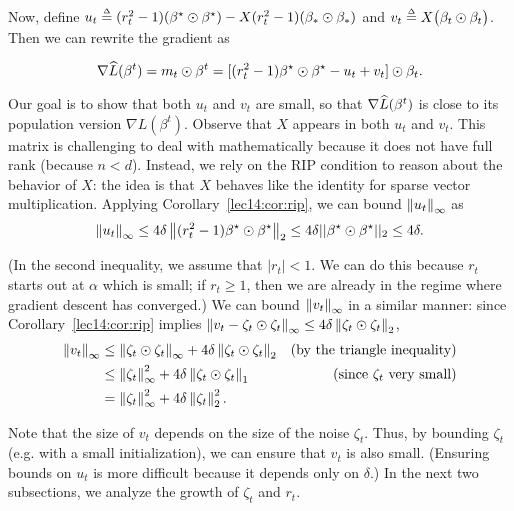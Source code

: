 Now, define $u_{t} \defeq (r_{t}^{2} - 1) (\beta^\star \odot \beta^\star) - X (r_{t}^{2} - 1) (\beta_{*} \odot \beta_{*})$ and $v_{t} \defeq X \big(\beta_{t} \odot \beta_{t}\big)$. Then we can rewrite the gradient as

\begin{equation}
    \nabla \widehat{L}(\beta^t) = m_{t} \odot \beta^{t} = [(r_{t}^{2} -1) \beta^\star \odot \beta^\star - u_{t} + v_{t}] \odot \beta_{t}. \label{lec14:eqn:emp-gradient}
\end{equation}

Our goal is to show that both $u_t$ and $v_t$ are small, so that $\nabla \widehat{L}(\beta^t)$ is close to its population version $\nabla L(\beta^t)$. Observe that $X$ appears in both $u_{t}$ and $v_{t}$. This matrix is challenging to deal with mathematically because it does not have full rank (because $n < d$). Instead, we rely on the RIP condition to reason about the behavior of $X$: the idea is that $X$ behaves like the identity for sparse vector multiplication. Applying Corollary~\ref{lec14:cor:rip}, we can bound $\left\|u_{t}\right\|_{\infty}$ as
\begin{equation} \label{lec14:eqn:u-inf-norm}
    \left\|u_{t}\right\|_{\infty} \leq 4\delta \left\|(r_t^2 - 1)  \beta^\star \odot \beta^\star \right\|_{2} 
    \leq 4\delta ||\beta^\star \odot \beta^\star||_{2} \leq 4\delta.
\end{equation}

(In the second inequality, we assume that $|r_t| < 1$. We can do this because $r_t$ starts out at $\alpha$ which is small; if $r_t \geq 1$, then we are already in the regime where gradient descent has converged.) We can bound $\left\|v_{t}\right\|_{\infty}$ in a similar manner: since Corollary~\ref{lec14:cor:rip} implies $\left\|v_t - \zeta_t \odot \zeta_t\right\|_\infty \leq 4\delta \left\|\zeta_{t} \odot \zeta_{t}\right\|_{2}$,
\begin{align}
    \left\|v_{t}\right\|_{\infty} &\leq \left\|\zeta_{t} \odot \zeta_{t}\right\|_{\infty} + 4\delta \left\|\zeta_{t} \odot \zeta_{t}\right\|_{2} &(\text{by the triangle inequality}) \\
    &\leq \left\|\zeta_{t}\right\|_{\infty}^{2} + 4\delta \left\|\zeta_{t} \odot \zeta_{t}\right\|_{1} &(\text{since } \zeta_t \text{ very small}) \\
    &= \left\|\zeta_{t}\right\|_{\infty}^{2} + 4\delta \left\|\zeta_{t}\right\|_{2}^{2}. \label{lec14:eqn:v-inf-norm}
\end{align}

Note that the size of $v_t$ depends on the size of the noise $\zeta_t$. Thus, by bounding $\zeta_t$ (e.g. with a small initialization), we can ensure that $v_t$ is also small. (Ensuring bounds on $u_t$ is more difficult because it depends only on $\delta$.) In the next two subsections, we analyze the growth of $\zeta_t$ and $r_t$.

